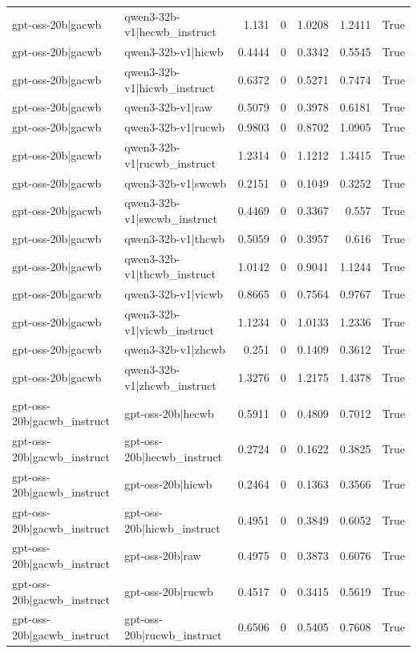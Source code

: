 \begin{table}
\begin{tabular}{l l r r r r l}
gpt-oss-20b|gacwb & qwen3-32b-v1|hecwb_instruct & 1.131 & 0 & 1.0208 & 1.2411 & True \\
gpt-oss-20b|gacwb & qwen3-32b-v1|hicwb & 0.4444 & 0 & 0.3342 & 0.5545 & True \\
gpt-oss-20b|gacwb & qwen3-32b-v1|hicwb_instruct & 0.6372 & 0 & 0.5271 & 0.7474 & True \\
gpt-oss-20b|gacwb & qwen3-32b-v1|raw & 0.5079 & 0 & 0.3978 & 0.6181 & True \\
gpt-oss-20b|gacwb & qwen3-32b-v1|rucwb & 0.9803 & 0 & 0.8702 & 1.0905 & True \\
gpt-oss-20b|gacwb & qwen3-32b-v1|rucwb_instruct & 1.2314 & 0 & 1.1212 & 1.3415 & True \\
gpt-oss-20b|gacwb & qwen3-32b-v1|swcwb & 0.2151 & 0 & 0.1049 & 0.3252 & True \\
gpt-oss-20b|gacwb & qwen3-32b-v1|swcwb_instruct & 0.4469 & 0 & 0.3367 & 0.557 & True \\
gpt-oss-20b|gacwb & qwen3-32b-v1|thcwb & 0.5059 & 0 & 0.3957 & 0.616 & True \\
gpt-oss-20b|gacwb & qwen3-32b-v1|thcwb_instruct & 1.0142 & 0 & 0.9041 & 1.1244 & True \\
gpt-oss-20b|gacwb & qwen3-32b-v1|vicwb & 0.8665 & 0 & 0.7564 & 0.9767 & True \\
gpt-oss-20b|gacwb & qwen3-32b-v1|vicwb_instruct & 1.1234 & 0 & 1.0133 & 1.2336 & True \\
gpt-oss-20b|gacwb & qwen3-32b-v1|zhcwb & 0.251 & 0 & 0.1409 & 0.3612 & True \\
gpt-oss-20b|gacwb & qwen3-32b-v1|zhcwb_instruct & 1.3276 & 0 & 1.2175 & 1.4378 & True \\
gpt-oss-20b|gacwb_instruct & gpt-oss-20b|hecwb & 0.5911 & 0 & 0.4809 & 0.7012 & True \\
gpt-oss-20b|gacwb_instruct & gpt-oss-20b|hecwb_instruct & 0.2724 & 0 & 0.1622 & 0.3825 & True \\
gpt-oss-20b|gacwb_instruct & gpt-oss-20b|hicwb & 0.2464 & 0 & 0.1363 & 0.3566 & True \\
gpt-oss-20b|gacwb_instruct & gpt-oss-20b|hicwb_instruct & 0.4951 & 0 & 0.3849 & 0.6052 & True \\
gpt-oss-20b|gacwb_instruct & gpt-oss-20b|raw & 0.4975 & 0 & 0.3873 & 0.6076 & True \\
gpt-oss-20b|gacwb_instruct & gpt-oss-20b|rucwb & 0.4517 & 0 & 0.3415 & 0.5619 & True \\
gpt-oss-20b|gacwb_instruct & gpt-oss-20b|rucwb_instruct & 0.6506 & 0 & 0.5405 & 0.7608 & True \\

\end{tabular}
\end{table}
